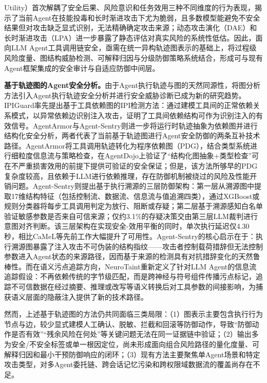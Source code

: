 Utility）首次解耦了安全后果、风险意识和任务效用三种不同维度的行为表现，揭示了当前Agent在技能投毒和长时渐进攻击下尤为脆弱，且多数模型能避免不安全结果但对攻击缺乏显式识别，无法精确确定攻击来源；动态攻击演化（DAE）和长时渐进攻击（LPA）进一步暴露了静态评估对真实风险的系统性低估。因此，面向LLM Agent工具调用链安全，亟需在统一异构轨迹图表示的基础上，将过程级风险度量、图结构威胁检测、可解释归因与分级防御策略系统结合，形成可与现有Agent框架集成的安全审计与自适应防御中间层。

\textbf{基于轨迹图的Agent安全分析。}由于Agent执行轨迹与图的天然同源性，将图分析方法引入Agent执行轨迹安全分析并进行安全威胁诊断已成为新的研究趋势。IPIGuard\cite{an2025ipiguard}率先提出基于工具依赖图的IPI检测方法：通过建模工具间的正常依赖关系模式，以异常依赖边识别注入攻击，证明了工具间依赖结构可作为识别注入的有效信号。AgentArmor\cite{wang2025agentarmor}与Agent-Sentry\cite{sequeira2026agentsentry}则进一步将运行时轨迹抽象为依赖图并进行结构化安全分析，两者代表了当前基于轨迹图进行Agent安全防御的两条互补技术路径。AgentArmor将工具调用轨迹转化为程序依赖图（PDG），结合类型系统进行细粒度信息流与策略检查，在AgentDojo上验证了“结构化图抽象+类型检查”可在不严重损害效用的前提下提供可验证的安全保证；但是，该方法所够早的PDG复杂度较高，且依赖于LLM进行依赖推理，存在防御机制被绕过的风险及性能开销问题。Agent-Sentry则提出基于执行溯源的三层防御架构：第一层从溯源图中提取17维结构特征（包括控制流、数据流、信息流与值追溯四类），通过XGBoost或规则分类器将每步工具调用判定为放行、阻断或存疑；第二层基于溯源感知白名单验证敏感参数是否来自可信来源；仅约3.1\%的存疑决策交由第三层LLM裁判进行意图对齐判断。该三层架构在实现安全-效用平衡的同时，单次执行延迟仅4.30秒，相比CaMeL等先前工作大幅提升了可用性。Agent-Sentry的核心启示在于：执行溯源图暴露了注入攻击不可伪装的结构指纹——攻击者控制载荷措辞但无法控制参数进入Agent状态的来源路径，因而基于来源的检测具有对抗措辞变化的天然鲁棒性。而在语义污点追踪方向，NeuroTaint\cite{cai2026ghost}重新定义了针对LLM Agent的信息流追踪假设：不再依赖传统的字节级匹配，而是跨神经与符号组件传播污点标记，追踪不可信数据在经过摘要、推理或改写等语义转换后对工具参数的间接影响，为捕获语义层面的隐蔽注入提供了新的技术路径。

然而，上述基于轨迹图的方法仍共同面临三类局限：（1）图表示主要包含执行行为节点与边，较少显式建模人工确认、脱敏、拦截和回滚等防御动作，导致“防御动作是否有效”“残余风险在何处”等关键问题无法在同一证据链中验证；（2）输出多为安全/不安全标签或单一根因定位，尚未形成面向组合风险路径的量化度量、可解释归因和最小干预防御响应的闭环；（3）现有方法主要聚焦单Agent场景和特定攻击类型，对多Agent委托链、跨会话记忆污染和跨权限域数据流的覆盖尚存在不足。


